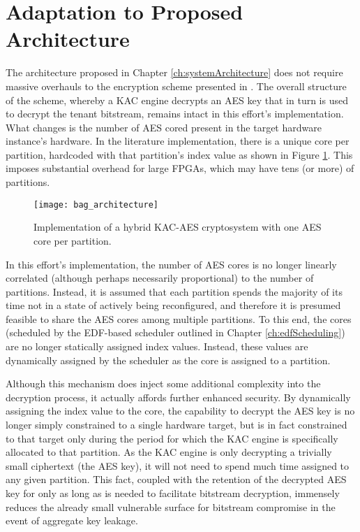 \section{Adaptation to Proposed Architecture}\label{sec:KACArchitecture}
The architecture proposed in Chapter \ref{ch:systemArchitecture} does not require massive overhauls to the encryption scheme presented in \cite{bag_cryptographically_2020}. The overall structure of the scheme, whereby a KAC engine decrypts an AES key that in turn is used to decrypt the tenant bitstream, remains intact in this effort's implementation. What changes is the number of AES cored present in the target hardware instance's hardware. In the literature implementation, there is a unique core per partition, hardcoded with that partition's index value as shown in Figure \ref{fig:bag_architecture}. This imposes substantial overhead for large FPGAs, which may have tens (or more) of partitions. 

\begin{figure}[ht]
    \centering
    \texttt{[image: bag\_architecture]}
    \caption[Literature Cryptosystem Implementation]{Implementation of a hybrid KAC-AES cryptosystem with one AES core per partition. \cite{bag_cryptographically_2020}}
    \label{fig:bag_architecture}
\end{figure}


In this effort's implementation, the number of AES cores is no longer linearly correlated (although perhaps necessarily proportional) to the number of partitions. Instead, it is assumed that each partition spends the majority of its time not in a state of actively being reconfigured, and therefore it is presumed feasible to share the AES cores among multiple partitions. To this end, the cores (scheduled by the EDF-based scheduler outlined in Chapter \ref{ch:edfScheduling}) are no longer statically assigned index values. Instead, these values are dynamically assigned by the scheduler as the core is assigned to a partition.

Although this mechanism does inject some additional complexity into the decryption process, it actually affords further enhanced security. By dynamically assigning the index value to the core, the capability to decrypt the AES key is no longer simply constrained to a single hardware target, but is in fact constrained to that target only during the period for which the KAC engine is specifically allocated to that partition. As the KAC engine is only decrypting a trivially small ciphertext (the AES key), it will not need to spend much time assigned to any given partition. This fact, coupled with the retention of the decrypted AES key for only as long as is needed to facilitate bitstream decryption, immensely reduces the already small vulnerable surface for bitstream compromise in the event of aggregate key leakage.